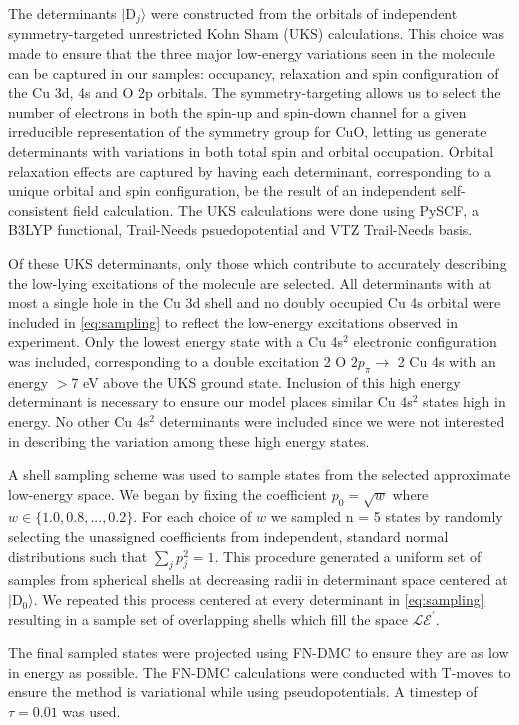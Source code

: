 \documentclass[12pt]{article}
\begin{document}
The determinants $|\text{D}_j \rangle$ were constructed from the orbitals of independent symmetry-targeted unrestricted Kohn Sham (UKS) calculations.
This choice was made to ensure that the three major low-energy variations seen in the molecule can be captured in our samples: occupancy, relaxation and spin configuration of the Cu 3d, 4s and O 2p orbitals.
The symmetry-targeting allows us to select the number of electrons in both the spin-up and spin-down channel for a given irreducible representation of the symmetry group for CuO, letting us generate determinants with variations in both total spin and orbital occupation.
Orbital relaxation effects are captured by having each determinant, corresponding to a unique orbital and spin configuration, be the result of an independent self-consistent field calculation.
The UKS calculations were done using PySCF, a B3LYP functional, Trail-Needs psuedopotential and VTZ Trail-Needs basis.

Of these UKS determinants, only those which contribute to accurately describing the low-lying excitations of the molecule are selected.
All determinants with at most a single hole in the Cu 3d shell and no doubly occupied Cu 4s orbital were included in \eqref{eq:sampling} to reflect the low-energy excitations observed in experiment.
Only the lowest energy state with a Cu 4s$^2$ electronic configuration was included, corresponding to a double excitation 2 O ${2p_\pi} \rightarrow$ 2 Cu 4s with an energy $>7$ eV above the UKS ground state.
Inclusion of this high energy determinant is necessary to ensure our model places similar Cu 4s$^2$ states high in energy.
No other Cu 4s$^2$ determinants were included since we were not interested in describing the variation among these high energy states.

A shell sampling scheme was used to sample states from the selected approximate low-energy space.
We began by fixing the coefficient $p_0 = \sqrt{w}$ where $w \in \{1.0, 0.8, ..., 0.2\}$. 
For each choice of $w$ we sampled n = 5 states by randomly selecting the unassigned coefficients from independent, standard normal distributions such that $\sum_j p_j^2 = 1$. 
This procedure generated a uniform set of samples from spherical shells at decreasing radii in determinant space centered at $|\text{D}_0\rangle$.
We repeated this process centered at every determinant in \eqref{eq:sampling} resulting in a sample set of overlapping shells which fill the space $\mathcal{LE}^\prime$.

The final sampled states were projected using FN-DMC to ensure they are as low in energy as possible.
The FN-DMC calculations were conducted with T-moves to ensure the method is variational while using pseudopotentials.
A timestep of $\tau = 0.01$ was used.
\end{document}
